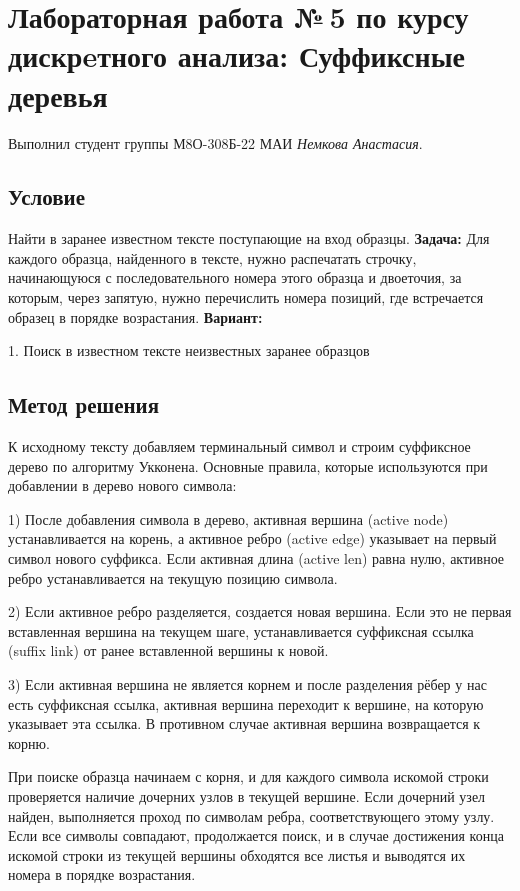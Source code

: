 \documentclass[12pt]{article}
\begin{document}
\section*{Лабораторная работа №\,5 по курсу дискрeтного анализа: Суффиксные деревья}

Выполнил студент группы М8О-308Б-22 МАИ \textit{Немкова Анастасия}.

\subsection*{Условие}
Найти в заранее известном тексте поступающие на вход образцы.
\newline
\textbf{Задача:}
Для каждого образца, найденного в тексте, нужно распечатать строчку, начинающуюся с последовательного номера этого образца и двоеточия, за которым, через запятую, нужно перечислить номера позиций, где встречается образец в порядке возрастания.
\newline
\textbf{Вариант:}

    1.  Поиск в известном тексте неизвестных заранее образцов


\subsection*{Метод решения}

К исходному тексту добавляем терминальный символ и строим суффиксное дерево по алгоритму Укконена.
Основные правила, которые используются при добавлении в дерево нового символа:

1)  После добавления символа в дерево, активная вершина (active node) устанавливается на корень, а активное ребро (active edge) указывает на первый символ нового суффикса. Если активная длина (active len) равна нулю, активное ребро устанавливается на текущую позицию символа.\newline

2) Если активное ребро разделяется, создается новая вершина. Если это не первая вставленная вершина на текущем шаге, устанавливается суффиксная ссылка (suffix link) от ранее вставленной вершины к новой.\newline

3) Если активная вершина не является корнем и после разделения рёбер у нас есть суффиксная ссылка, активная вершина переходит к вершине, на которую указывает эта ссылка. В противном случае активная вершина возвращается к корню.\newline

При поиске образца начинаем с корня, и для каждого символа искомой строки проверяется наличие дочерних узлов в текущей вершине. Если дочерний узел найден, выполняется проход по символам ребра, соответствующего этому узлу. Если все символы совпадают, продолжается поиск, и в случае достижения конца искомой строки из текущей вершины обходятся все листья и выводятся их номера в порядке возрастания. 
\end{document}
